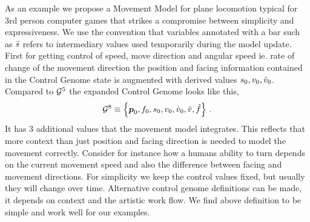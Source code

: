 As an example we propose a Movement Model for plane locomotion typical for 3rd person computer games  
that strikes a compromise between simplicity and expressiveness. We use the convention that variables annotated with a bar such as $\bar{s}$ refers to intermediary values used temporarily during the model update. 
%
First for getting control of speed, move direction and angular speed ie. rate of change of the movement direction the position and facing information contained in the Control Genome state is augmented with derived values $s_0, v_0, {\dot{v}}_0$. 
%
Compared to $\mathcal{G}^{5}$ the expanded Control Genome looks like this,
\begin{subequations}
\begin{align}
    \mathcal{G}^{8} \equiv \left\{ \boldsymbol{p }_0,f_0,s_0,v_0,{\dot{v}}_0,\hat{v},\hat{f} \right\}\,.
\end{align}
\end{subequations}
It has 3 additional values that the movement model integrates. This reflects that more context than just position and facing direction is needed to model the movement correctly. Consider for instance how a humans ability to turn depends on the current movement speed and also the difference between facing and movement directions. For simplicity we keep the control values fixed, but usually they will change over time.
Alternative control genome definitions can be made, it depends on context and the artistic work flow. We find above definition to be simple and work well for our examples.

